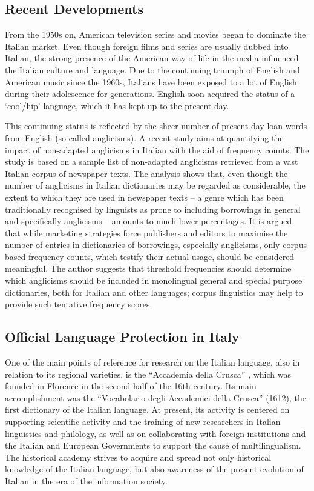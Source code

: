 \begin{multicols}{2}
\subsection{Recent Developments}

From the 1950s on, American television series and movies began to dominate the
Italian market. Even though foreign films and series are usually dubbed into
Italian, the strong presence of the American way of life in the media
influenced the Italian culture and language. Due to the continuing triumph of
English and American music since the 1960s, Italians have been exposed to a
lot of English during their adolescence for generations. English soon acquired
the status of a `cool/hip' language, which it has kept up to the present
day.

This continuing status is reflected by the sheer number of present-day loan
words from English (so-called anglicisms). A recent study \cite{Fischer} aims
at quantifying the impact of non-adapted anglicisms in Italian with the aid of
frequency counts. The study is based on a sample list of non-adapted anglicisms
retrieved from a vast Italian corpus of newspaper texts. The analysis shows
that, even though the number of anglicisms in Italian dictionaries may be
regarded as considerable, the extent to which they are used in newspaper texts
-- a genre which has been traditionally recognised by linguists as prone to
including borrowings in general and specifically anglicisms -- amounts to much
lower percentages. It is argued that while marketing strategies force
publishers and editors to maximise the number of entries in dictionaries of
borrowings, especially anglicisms, only corpus-based frequency counts, which
testify their actual usage, should be considered meaningful. The author
suggests that threshold frequencies should determine which anglicisms should
be included in monolingual general and special purpose dictionaries, both for
Italian and other languages; corpus linguistics may help to provide such
tentative frequency scores.

\subsection{Official Language Protection in Italy}

One of the main points of reference for research on the Italian
language, also in relation to its regional varieties, is the
“Accademia della Crusca” \cite{Crusca}, which was founded in Florence
in the second half of the 16th century. Its main accomplishment was
the “Vocabolario degli Accademici della Crusca” (1612), the first
dictionary of the Italian language. At present, its activity is
centered on supporting scientific activity and the training of new
researchers in Italian linguistics and philology, as well as on
collaborating with foreign institutions and the Italian and European
Governments to support the cause of multilingualism. The historical
academy strives to acquire and spread not only historical knowledge of
the Italian language, but also awareness of the present evolution of
Italian in the era of the information society.


\end{multicols}
